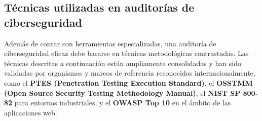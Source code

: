 \documentclass[a4paper, 10pt]{article}
\begin{document}
  
    
    \subsection{Técnicas utilizadas en auditorías de ciberseguridad}

    Además de contar con herramientas especializadas, una auditoría de ciberseguridad eficaz debe basarse en técnicas metodológicas contrastadas. Las técnicas descritas a continuación están ampliamente consolidadas y han sido validadas por organismos y marcos de referencia reconocidos internacionalmente, como el \textbf{PTES (Penetration Testing Execution Standard)}, el \textbf{OSSTMM (Open Source Security Testing Methodology Manual)}, el \textbf{NIST SP 800-82} para entornos industriales, y el \textbf{OWASP Top 10} en el ámbito de las aplicaciones web.
    
\end{document}
